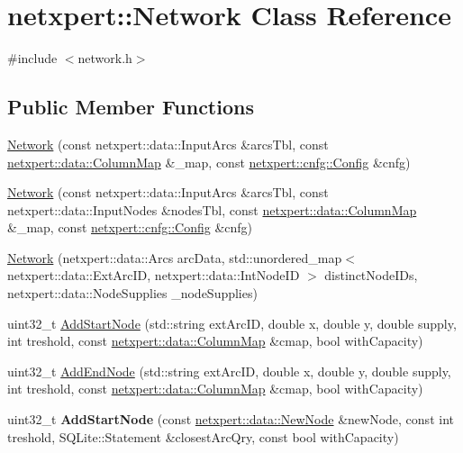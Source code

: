 \hypertarget{classnetxpert_1_1Network}{}\section{netxpert\+:\+:Network Class Reference}
\label{classnetxpert_1_1Network}


{\ttfamily \#include $<$network.\+h$>$}

\subsection*{Public Member Functions}
\begin{DoxyCompactItemize}
\item 
\hyperlink{classnetxpert_1_1Network_a82ce86cfb2191b3be3bea62963f6a8ce}{Network} (const netxpert\+::data\+::\+Input\+Arcs \&arcs\+Tbl, const \hyperlink{structnetxpert_1_1data_1_1ColumnMap}{netxpert\+::data\+::\+Column\+Map} \&\+\_\+map, const \hyperlink{structnetxpert_1_1cnfg_1_1Config}{netxpert\+::cnfg\+::\+Config} \&cnfg)
\item 
\hyperlink{classnetxpert_1_1Network_ad1d9c13ff9b01fd5a373602ba9dc2c99}{Network} (const netxpert\+::data\+::\+Input\+Arcs \&arcs\+Tbl, const netxpert\+::data\+::\+Input\+Nodes \&nodes\+Tbl, const \hyperlink{structnetxpert_1_1data_1_1ColumnMap}{netxpert\+::data\+::\+Column\+Map} \&\+\_\+map, const \hyperlink{structnetxpert_1_1cnfg_1_1Config}{netxpert\+::cnfg\+::\+Config} \&cnfg)
\item 
\hyperlink{classnetxpert_1_1Network_a5598c6077e3522f979e4a038912add6a}{Network} (netxpert\+::data\+::\+Arcs arc\+Data, std\+::unordered\+\_\+map$<$ netxpert\+::data\+::\+Ext\+Arc\+ID, netxpert\+::data\+::\+Int\+Node\+ID $>$ distinct\+Node\+I\+Ds, netxpert\+::data\+::\+Node\+Supplies \+\_\+node\+Supplies)
\item 
uint32\+\_\+t \hyperlink{classnetxpert_1_1Network_ae9b93ddc18df363c897171176aa935ac}{Add\+Start\+Node} (std\+::string ext\+Arc\+ID, double x, double y, double supply, int treshold, const \hyperlink{structnetxpert_1_1data_1_1ColumnMap}{netxpert\+::data\+::\+Column\+Map} \&cmap, bool with\+Capacity)
\item 
uint32\+\_\+t \hyperlink{classnetxpert_1_1Network_ac37c3c27a1a641b4f2cead9f0128f1ff}{Add\+End\+Node} (std\+::string ext\+Arc\+ID, double x, double y, double supply, int treshold, const \hyperlink{structnetxpert_1_1data_1_1ColumnMap}{netxpert\+::data\+::\+Column\+Map} \&cmap, bool with\+Capacity)
\item 
uint32\+\_\+t {\bfseries Add\+Start\+Node} (const \hyperlink{structnetxpert_1_1data_1_1NewNode}{netxpert\+::data\+::\+New\+Node} \&new\+Node, const int treshold, S\+Q\+Lite\+::\+Statement \&closest\+Arc\+Qry, const bool with\+Capacity)\hypertarget{classnetxpert_1_1Network_a8c6e7f36e5d9a8d6b3a94da9f65910ce}{}\label{classnetxpert_1_1Network_a8c6e7f36e5d9a8d6b3a94da9f65910ce}


\end{DoxyCompactItemize}
